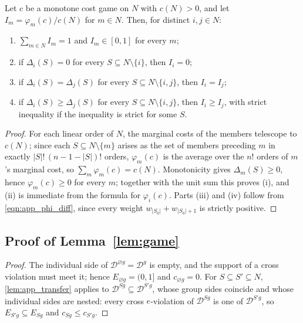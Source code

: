 \documentclass[11 pt]{article}
\begin{document}
\begin{lemma}\label{lem:app_shares}
Let $c$ be a monotone cost game on $N$ with $c(N) > 0$, and let $I_{m} = \varphi_{m}(c)/c(N)$ for $m \in N$. Then, for distinct $i, j \in N$:
\begin{enumerate}
\item[(i)] $\sum_{m \in N} I_{m} = 1$ and $I_{m} \in [0,1]$ for every $m$;
\item[(ii)] if $\Delta_{i}(S) = 0$ for every $S \subseteq N \setminus \{i\}$, then $I_{i} = 0$;
\item[(iii)] if $\Delta_{i}(S) = \Delta_{j}(S)$ for every $S \subseteq N \setminus \{i,j\}$, then $I_{i} = I_{j}$;
\item[(iv)] if $\Delta_{i}(S) \geq \Delta_{j}(S)$ for every $S \subseteq N \setminus \{i,j\}$, then $I_{i} \geq I_{j}$, with strict inequality if the inequality is strict for some $S$.
\end{enumerate}
\end{lemma}

\begin{proof}
For each linear order of $N$, the marginal costs of the members telescope to $c(N)$; since each $S \subseteq N \setminus \{m\}$ arises as the set of members preceding $m$ in exactly $|S|!\,(n-1-|S|)!$ orders, $\varphi_{m}(c)$ is the average over the $n!$ orders of $m$'s marginal cost, so $\sum_{m} \varphi_{m}(c) = c(N)$. Monotonicity gives $\Delta_{m}(S) \geq 0$, hence $\varphi_{m}(c) \geq 0$ for every $m$; together with the unit sum this proves (i), and (ii) is immediate from the formula for $\varphi_{i}(c)$. Parts (iii) and (iv) follow from \eqref{eqn:app_phi_diff}, since every weight $w_{|S_0|} + w_{|S_0|+1}$ is strictly positive.
\end{proof}


\subsection{Proof of Lemma~\ref{lem:game}}\label{subsec:app_lemgame}

\begin{proof}
The individual side of $\mathcal{D}^{\varnothing g} = \mathcal{D}^{g}$ is empty, and the support of a cross violation must meet it; hence $E_{\varnothing g} = (0,1]$ and $c_{\varnothing g} = 0$. For $S \subseteq S' \subseteq N$, \autoref{lem:app_transfer} applies to $\mathcal{D}^{Sg} \subseteq \mathcal{D}^{S'g}$, whose group sides coincide and whose individual sides are nested: every cross $e$-violation of $\mathcal{D}^{Sg}$ is one of $\mathcal{D}^{S'g}$, so $E_{S'g} \subseteq E_{Sg}$ and $c_{Sg} \leq c_{S'g}$.
\end{proof}
\end{document}
